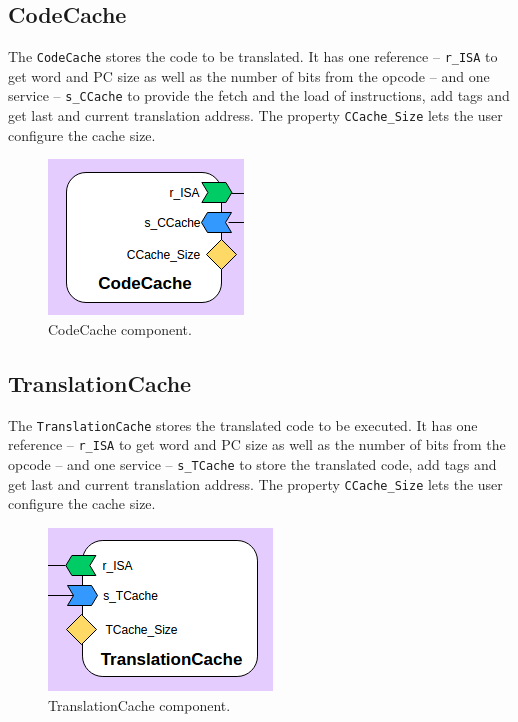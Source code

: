 \documentclass{report}
\begin{document}
		\subsection{CodeCache}
		
		\par The \texttt{CodeCache} stores the code to be translated. It has one reference -- \texttt{r\_ISA} to get word and PC size as well as the number of bits from the opcode -- and one service -- \texttt{s\_CCache} to provide the fetch and the load of instructions, add tags and get last and current translation address. The property \texttt{CCache\_Size} lets the user configure the cache size. 
		
		\begin{figure} [H]
			\centering
			\includegraphics[width=0.3\linewidth]{Images/arch-ref/CodeCache}
			\caption{CodeCache component.}
			\label{fig:CodeCache}
		\end{figure}
		
		\subsection{TranslationCache}
		
		\par The \texttt{TranslationCache} stores the translated code to be executed. It has one reference -- \texttt{r\_ISA} to get word and PC size as well as the number of bits from the opcode -- and one service -- \texttt{s\_TCache} to store the translated code, add tags and get last and current translation address. The property \texttt{CCache\_Size} lets the user configure the cache size. 
		
		\begin{figure} [H]
			\centering
			\includegraphics[width=0.3\linewidth]{Images/arch-ref/TranslationCache}
			\caption{TranslationCache component.}
			\label{fig:TranslationCache}
		\end{figure}
		
\end{document}
